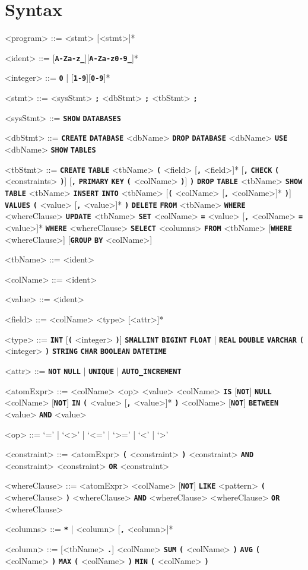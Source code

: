 \documentclass{article}
\renewcommand{\t}[1]{\texttt{\textbf{#1}}}
\begin{document}
\section{Syntax}
\setlength{\grammarindent}{10em}
\begin{grammar}

<program> ::= <stmt> [<stmt>]*

<ident> ::= [\t{A-Za-z_}][\t{A-Za-z0-9_}]*

<integer> ::= \t{0} | [\t{1-9}][\t{0-9}]*

<stmt> ::= <sysStmt> \t{;} \alt <dbStmt> \t{;} \alt <tbStmt> \t{;}

<sysStmt> ::= \t{SHOW} \t{DATABASES}

<dbStmt> ::= \t{CREATE} \t{DATABASE} <dbName>
\alt \t{DROP} \t{DATABASE} <dbName>
\alt \t{USE} <dbName>
\alt \t{SHOW} \t{TABLES}

<tbStmt> ::= \t{CREATE} \t{TABLE} <tbName> \t{(} <field> [\t{,} <field>]* [\t{,} \t{CHECK} \t{(} <constraints> \t{)}]  [\t{,} \t{PRIMARY} \t{KEY} \t{(} <colName> \t{)}] \t{)}
\alt \t{DROP} \t{TABLE} <tbName>
\alt \t{SHOW} \t{TABLE} <tbName>
\alt \t{INSERT} \t{INTO} <tbName> [\t{(} <colName> [\t{,} <colName>]* \t{)}] \t{VALUES} \t{(} <value> [\t{,} <value>]* \t{)}
\alt \t{DELETE} \t{FROM} <tbName> \t{WHERE} <whereClause>
\alt \t{UPDATE} <tbName> \t{SET} <colName> \t{=} <value> [\t{,} <colName> \t{=} <value>]* \t{WHERE} <whereClause>
\alt \t{SELECT} <columns> \t{FROM} <tbName> [\t{WHERE} <whereClause>] [\t{GROUP} \t{BY} <colName>]

<tbName> ::= <ident>

<colName> ::= <ident>

<value> ::= <ident>

<field> ::= <colName> <type> [<attr>]*

<type> ::= \t{INT} [\t{(} <integer> \t{)}]
\alt \t{SMALLINT}
\alt \t{BIGINT}
\alt \t{FLOAT} | \t{REAL}
\alt \t{DOUBLE}
\alt \t{VARCHAR} \t{(} <integer> \t{)}
\alt \t{STRING}
\alt \t{CHAR}
\alt \t{BOOLEAN}
\alt \t{DATETIME}

<attr> ::= \t{NOT} \t{NULL} | \t{UNIQUE} | \t{AUTO_INCREMENT}

<atomExpr> ::= <colName> <op> <value>
\alt <colName> \t{IS} [\t{NOT}] \t{NULL}
\alt <colName> [\t{NOT}] \t{IN} \t{(} <value> [\t{,} <value>]* \t{)}
\alt <colName> [\t{NOT}] \t{BETWEEN} <value> \t{AND} <value>

<op> ::= `=' | `<>' | `<=' | `>=' | `<' | `>'

<constraint> ::= <atomExpr>
\alt \t{(} <constraint> \t{)}
\alt <constraint> \t{AND} <constraint>
\alt <constraint> \t{OR} <constraint>

<whereClause> ::= <atomExpr>
\alt <colName> [\t{NOT}] \t{LIKE} <pattern>
\alt \t{(} <whereClause> \t{)}
\alt <whereClause> \t{AND} <whereClause>
\alt <whereClause> \t{OR} <whereClause>

<columns> ::= \t{*} | <column> [\t{,} <column>]*

<column> ::= [<tbName> \t{.}] <colName>
\alt \t{SUM} \t{(} <colName> \t{)}
\alt \t{AVG} \t{(} <colName> \t{)}
\alt \t{MAX} \t{(} <colName> \t{)}
\alt \t{MIN} \t{(} <colName> \t{)}

\end{grammar}
\end{document}
